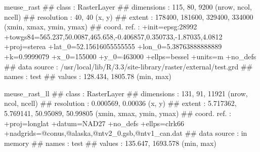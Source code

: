 \documentclass[11pt,ignorenonframetext,]{beamer}
\newenvironment{Shaded}{}{}
\newcommand{\NormalTok}[1]{#1}
\let\oldShaded\Shaded
\let\endoldShaded\endShaded
\renewenvironment{Shaded}{\footnotesize\begin{spacing}{0.9}\oldShaded}{\endoldShaded\end{spacing}}
\let\oldverbatim\verbatim
\let\endoldverbatim\endverbatim
\newcommand{\scriptoutput}{
  \renewenvironment{Shaded}{\scriptsize\begin{spacing}{0.9}\oldShaded}{\endoldShaded\end{spacing}}
  \renewenvironment{verbatim}{\scriptsize\begin{spacing}{0.9}\oldverbatim}{\endoldverbatim\end{spacing}}
}
\begin{document}
\begin{frame}[fragile,t]{}

\scriptoutput

\begin{Shaded}
\begin{Highlighting}[]
\NormalTok{meuse_rast}
\NormalTok{## class       : RasterLayer }
\NormalTok{## dimensions  : 115, 80, 9200  (nrow, ncol, ncell)}
\NormalTok{## resolution  : 40, 40  (x, y)}
\NormalTok{## extent      : 178400, 181600, 329400, 334000  (xmin, xmax, ymin, ymax)}
\NormalTok{## coord. ref. : +init=epsg:28992 +towgs84=565.237,50.0087,465.658,-0.406857,0.350733,-1.87035,4.0812 +proj=sterea +lat_0=52.15616055555555 +lon_0=5.38763888888889 +k=0.9999079 +x_0=155000 +y_0=463000 +ellps=bessel +units=m +no_defs }
\NormalTok{## data source : /usr/local/lib/R/3.3/site-library/raster/external/test.grd }
\NormalTok{## names       : test }
\NormalTok{## values      : 128.434, 1805.78  (min, max)}

\NormalTok{meuse_rast_ll}
\NormalTok{## class       : RasterLayer }
\NormalTok{## dimensions  : 131, 91, 11921  (nrow, ncol, ncell)}
\NormalTok{## resolution  : 0.000569, 0.00036  (x, y)}
\NormalTok{## extent      : 5.717362, 5.769141, 50.95089, 50.99805  (xmin, xmax, ymin, ymax)}
\NormalTok{## coord. ref. : +proj=longlat +datum=NAD27 +no_defs +ellps=clrk66 +nadgrids=@conus,@alaska,@ntv2_0.gsb,@ntv1_can.dat }
\NormalTok{## data source : in memory}
\NormalTok{## names       : test }
\NormalTok{## values      : 135.647, 1693.578  (min, max)}
\end{Highlighting}
\end{Shaded}

\end{frame}
\end{document}
